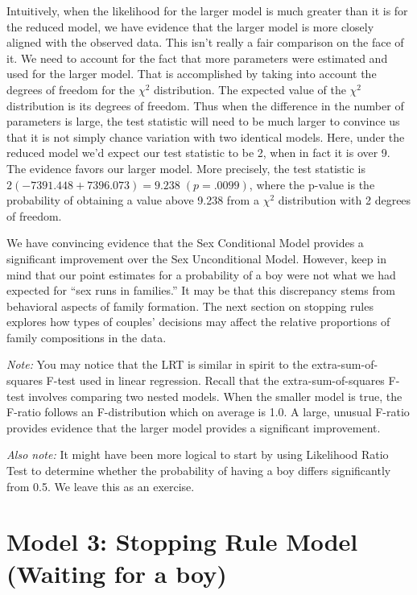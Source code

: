 \documentclass[
]{krantz}
\begin{document}
Intuitively, when the likelihood for the larger model is much greater than it is for the reduced model, we have evidence that the larger model is more closely aligned with the observed data. This isn't really a fair comparison on the face of it. We need to account for the fact that more parameters were estimated and used for the larger model. That is accomplished by taking into account the degrees of freedom for the \(\chi^2\) distribution. The expected value of the \(\chi^2\) distribution is its degrees of freedom. Thus when the difference in the number of parameters is large, the test statistic will need to be much larger to convince us that it is not simply chance variation with two identical models. Here, under the reduced model we'd expect our test statistic to be 2, when in fact it is over 9. The evidence favors our larger model. More precisely, the test statistic is \(2(-7391.448+7396.073) = 9.238\; (p=.0099)\), where the p-value is the probability of obtaining a value above 9.238 from a \(\chi^2\) distribution with 2 degrees of freedom.

We have convincing evidence that the Sex Conditional Model provides a significant improvement over the Sex Unconditional Model. However, keep in mind that our point estimates for a probability of a boy were not what we had expected for ``sex runs in families.'' It may be that this discrepancy stems from behavioral aspects of family formation. The next section on stopping rules explores how types of couples' decisions may affect the relative proportions of family compositions in the data.

\emph{Note: }You may notice that the LRT is similar in spirit to the extra-sum-of-squares F-test used in linear regression. Recall that the extra-sum-of-squares F-test involves comparing two nested models. When the smaller model is true, the F-ratio follows an F-distribution which on average is 1.0. A large, unusual F-ratio provides evidence that the larger model provides a significant improvement.

\emph{Also note: } It might have been more logical to start by using Likelihood Ratio Test to determine whether the probability of having a boy differs significantly from 0.5. We leave this as an exercise.

\hypertarget{model-3-stopping-rule-model-waiting-for-a-boy}{%
\section{Model 3: Stopping Rule Model (Waiting for a boy)}\label{model-3-stopping-rule-model-waiting-for-a-boy}}
\end{document}
